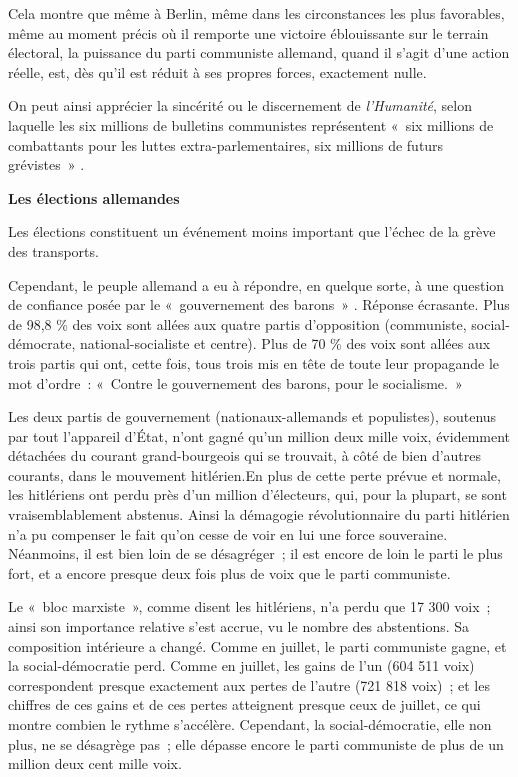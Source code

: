 \documentclass[french,twoside]{book} %
\begin{document}
Cela montre que même à Berlin, même dans les circonstances les plus favorables, même au moment précis où il remporte une victoire éblouissante sur le terrain électoral, la puissance du parti communiste allemand, quand il s'agit d'une action réelle, est, dès qu'il est réduit à ses propres forces, exactement nulle.\par
\par
On peut ainsi apprécier la sincérité ou le discernement de {\itshape l'Humanité}, selon laquelle les six millions de bulletins communistes représentent « six millions de combattants pour les luttes extra-parlementaires, six millions de futurs grévistes » .\par
\textbf{Les élections allemandes}\par
Les élections constituent un événement moins important que l'échec de la grève des transports.\par
Cependant, le peuple allemand a eu à répondre, en quelque sorte, à une question de confiance posée par le « gouvernement des barons » . Réponse écrasante. Plus de 98,8 \% des voix sont allées aux quatre partis d'opposition (communiste, social-démocrate, national-socialiste et centre). Plus de 70 \% des voix sont allées aux trois partis qui ont, cette fois, tous trois mis en tête de toute leur propagande le mot d'ordre : « Contre le gouvernement des barons, pour le socialisme. »\par
Les deux partis de gouvernement (nationaux-allemands et populistes), soutenus par tout l'appareil d'État, n'ont gagné qu'un million deux mille voix, évidemment détachées du courant grand-bourgeois qui se trouvait, à côté de bien d'autres courants, dans le mouvement hitlérien.En plus de cette perte prévue et normale, les hitlériens ont perdu près d'un million d'électeurs, qui, pour la plupart, se sont vraisemblablement abstenus. Ainsi la démagogie révolutionnaire du parti hitlérien n'a pu compenser le fait qu'on cesse de voir en lui une force souveraine. Néanmoins, il est bien loin de se désagréger ; il est encore de loin le parti le plus fort, et a encore presque deux fois plus de voix que le parti communiste.\par
Le « bloc marxiste », comme disent les hitlériens, n'a perdu que 17 300 voix ; ainsi son importance relative s'est accrue, vu le nombre des abstentions. Sa composition intérieure a changé. Comme en juillet, le parti communiste gagne, et la social-démocratie perd. Comme en juillet, les gains de l'un (604 511 voix) correspondent presque exactement aux pertes de l'autre (721 818 voix) ; et les chiffres de ces gains et de ces pertes atteignent presque ceux de juillet, ce qui montre combien le rythme s'accélère. Cependant, la social-démocratie, elle non plus, ne se désagrège pas ; elle dépasse encore le parti communiste de plus de un million deux cent mille voix.\par
\end{document}
